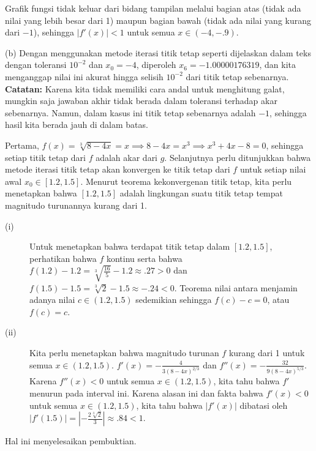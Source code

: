 \begin{description}
\begin{description}
Grafik fungsi tidak keluar dari bidang tampilan melalui bagian atas
(tidak ada nilai yang lebih besar dari 1) maupun bagian bawah (tidak
ada nilai yang kurang dari $-1$), sehingga $|f'(x)|<1$ untuk semua
$x\in(-4,-.9)$.
\end{description}
(b) Dengan menggunakan metode iterasi titik tetap seperti dijelaskan
dalam teks dengan toleransi $10^{-2}$ dan $x_{0}=-4$, diperoleh
$x_{6}=-1.00000176319$, dan kita menganggap nilai ini akurat hingga
selisih $10^{-2}$ dari titik tetap sebenarnya. \textbf{Catatan:}
Karena kita tidak memiliki cara andal untuk menghitung galat, mungkin
saja jawaban akhir tidak berada dalam toleransi terhadap akar sebenarnya.
Namun, dalam kasus ini titik tetap sebenarnya adalah $-1$, sehingga
hasil kita berada jauh di dalam batas.
\item [{\ref{exc:fixedpt-13}:}] Pertama, $f(x)=\sqrt[3]{8-4x}=x\implies8-4x=x^{3}\implies x^{3}+4x-8=0$,
sehingga setiap titik tetap dari $f$ adalah akar dari $g$. Selanjutnya
perlu ditunjukkan bahwa metode iterasi titik tetap akan konvergen
ke titik tetap dari $f$ untuk setiap nilai awal $x_{0}\in[1.2,1.5]$.
Menurut teorema kekonvergenan titik tetap, kita perlu menetapkan bahwa
$[1.2,1.5]$ adalah lingkungan suatu titik tetap tempat magnitudo
turunannya kurang dari 1.

\begin{description}
\item [{(i)}] Untuk menetapkan bahwa terdapat titik tetap dalam $[1.2,1.5]$,
perhatikan bahwa $f$ kontinu serta bahwa $f(1.2)-1.2=\sqrt[3]{\frac{16}{5}}-1.2\approx.27>0$
dan $f(1.5)-1.5=\sqrt[3]{2}-1.5\approx-.24<0$. Teorema nilai antara
menjamin adanya nilai $c\in(1.2,1.5)$ sedemikian sehingga $f(c)-c=0$,
atau $f(c)=c$.
\item [{(ii)}] Kita perlu menetapkan bahwa magnitudo turunan $f$ kurang
dari 1 untuk semua $x\in(1.2,1.5)$. $f'(x)=-\frac{4}{3(8-4x)^{2/3}}$
dan $f''(x)=-\frac{32}{9(8-4x)^{5/3}}$. Karena $f''(x)<0$ untuk
semua $x\in(1.2,1.5)$, kita tahu bahwa $f'$ menurun pada interval
ini. Karena alasan ini dan fakta bahwa $f'(x)<0$ untuk semua $x\in(1.2,1.5)$,
kita tahu bahwa $|f'(x)|$ dibatasi oleh $|f'(1.5)|=\left|-\frac{2\sqrt[3]{2}}{3}\right|\approx.84<1$.
\end{description}
Hal ini menyelesaikan pembuktian.
\end{description}

